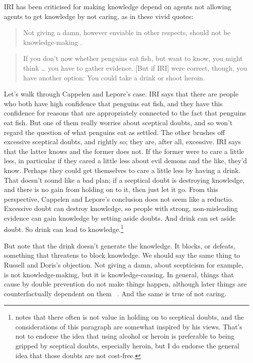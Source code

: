 \documentclass[11pt,oneside]{book}
\begin{document}
IRI has been criticised for making knowledge depend on agents not allowing agents to get knowledge by not caring, as in these vivid quotes:

\begin{quote}

Not giving a damn, however enviable in other respects, should not be knowledge-making . ~\citep[433]{RussellDoris2008}
\end{quote}
\begin{quote}

If you don't now whether penguins eat fish, but want to know, you might think {\ldots} you have to gather evidence. [But if IRI] were correct, though, you have another option: You could take a drink or shoot heroin. ~\citep[1044--5]{CappelenLepore2006}
\end{quote}
Let's walk through Cappelen and Lepore's case. IRI says that there are people who both have high confidence that penguins eat fish, and they have this confidence for reasons that are appropriately connected to the fact that penguins eat fish. But one of them really worries about sceptical doubts, and so won't regard the question of what penguins eat as settled. The other brushes off excessive sceptical doubts, and rightly so; they are, after all, excessive. IRI says that the latter knows and the former does not. If the former were to care a little less, in particular if they cared a little less about evil demons and the like, they'd know. Perhaps they could get themselves to care a little less by having a drink. That doesn't sound like a bad plan; if a sceptical doubt is destroying knowledge, and there is no gain from holding on to it, then just let it go. From this perspective, Cappelen and Lepore's conclusion does not seem like a reductio. Excessive doubt can destroy knowledge, so people with strong, non-misleading evidence can gain knowledge by setting aside doubts. And drink can set aside doubt. So drink can lead to knowledge.\footnote{ \citet{Wright2004} notes that there often is not value in holding on to sceptical doubts, and the considerations of this paragraph are somewhat inspired by his views. That's not to endorse the idea that using alcohol or heroin is preferable to being gripped by sceptical doubts, especially heroin, but I do endorse the general idea that those doubts are not cost-free.}

But note that the drink doesn't generate the knowledge. It blocks, or defeats, something that threatens to block knowledge. We should say the same thing to Russell and Doris's objection. Not giving a damn, about scepticism for example, is not knowledge-making, but it is knowledge-causing. In general, things that cause by double prevention do not make things happen, although later things are counterfactually dependent on them ~\citep{Lewis2004a}. And the same is true of not caring.
\end{document}
